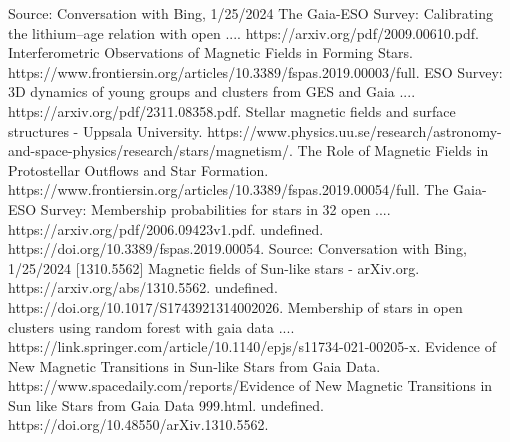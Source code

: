 Source: Conversation with Bing, 1/25/2024
The Gaia-ESO Survey: Calibrating the lithium–age relation with open .... https://arxiv.org/pdf/2009.00610.pdf.
Interferometric Observations of Magnetic Fields in Forming Stars. https://www.frontiersin.org/articles/10.3389/fspas.2019.00003/full.
ESO Survey: 3D dynamics of young groups and clusters from GES and Gaia .... https://arxiv.org/pdf/2311.08358.pdf.
Stellar magnetic fields and surface structures - Uppsala University. https://www.physics.uu.se/research/astronomy-and-space-physics/research/stars/magnetism/.
The Role of Magnetic Fields in Protostellar Outflows and Star Formation. https://www.frontiersin.org/articles/10.3389/fspas.2019.00054/full.
The Gaia-ESO Survey: Membership probabilities for stars in 32 open .... https://arxiv.org/pdf/2006.09423v1.pdf.
undefined. https://doi.org/10.3389/fspas.2019.00054.
Source: Conversation with Bing, 1/25/2024
[1310.5562] Magnetic fields of Sun-like stars - arXiv.org. https://arxiv.org/abs/1310.5562.
undefined. https://doi.org/10.1017/S1743921314002026.
Membership of stars in open clusters using random forest with gaia data .... https://link.springer.com/article/10.1140/epjs/s11734-021-00205-x.
Evidence of New Magnetic Transitions in Sun-like Stars from Gaia Data. https://www.spacedaily.com/reports/Evidence of New Magnetic Transitions in Sun like Stars from Gaia Data 999.html.
undefined. https://doi.org/10.48550/arXiv.1310.5562.



\endinput
